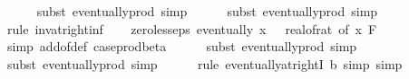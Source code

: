\begin{isabellebody}
\ \ \ \ \isamarkupfalse%
\ {\isacharparenleft}{\kern0pt}subst\ eventually{\isacharunderscore}{\kern0pt}prod{}{\isacharprime}{\kern0pt}{\isacharcomma}{\kern0pt}\ simp{\isacharparenright}{\kern0pt}\isanewline
\ \ \ \ \isamarkupfalse%
\ {\isacharparenleft}{\kern0pt}subst\ eventually{\isacharunderscore}{\kern0pt}prod{}{\isacharprime}{\kern0pt}{\isacharcomma}{\kern0pt}\ simp{\isacharparenright}{\kern0pt}\isanewline
\ \ \ \ \isamarkupfalse%
\ {\isacharparenleft}{\kern0pt}rule\ inv{\isacharunderscore}{\kern0pt}at{\isacharunderscore}{\kern0pt}right{\isacharunderscore}{\kern0pt}{}{\isacharunderscore}{\kern0pt}inf{\isacharparenright}{\kern0pt}\isanewline
\isanewline
\ \ \isamarkupfalse%
\ zero{\isacharunderscore}{\kern0pt}less{\isacharunderscore}{\kern0pt}eps{\isacharcolon}{\kern0pt}\ {\isachardoublequoteopen}eventually\ {\isacharparenleft}{\kern0pt}{\isasymlambda}x{\isachardot}{\kern0pt}\ {}\ {\isacharless}{\kern0pt}\ {\isacharparenleft}{\kern0pt}real{\isacharunderscore}{\kern0pt}of{\isacharunderscore}{\kern0pt}rat\ {\isacharparenleft}{\kern0pt}{\isasymepsilon}{\isacharunderscore}{\kern0pt}of\ x{\isacharparenright}{\kern0pt}{\isacharparenright}{\kern0pt}{\isacharparenright}{\kern0pt}\ {\isacharquery}{\kern0pt}F{\isachardoublequoteclose}\isanewline
\ \ \ \ \isamarkupfalse%
\ {\isacharparenleft}{\kern0pt}simp\ add{\isacharcolon}{\kern0pt}{\isasymepsilon}{\isacharunderscore}{\kern0pt}of{\isacharunderscore}{\kern0pt}def\ case{\isacharunderscore}{\kern0pt}prod{\isacharunderscore}{\kern0pt}beta{\isacharprime}{\kern0pt}{\isacharparenright}{\kern0pt}\isanewline
\ \ \ \ \isamarkupfalse%
\ {\isacharparenleft}{\kern0pt}subst\ eventually{\isacharunderscore}{\kern0pt}prod{}{\isacharprime}{\kern0pt}{\isacharcomma}{\kern0pt}\ simp{\isacharparenright}{\kern0pt}\isanewline
\ \ \ \ \isamarkupfalse%
\ {\isacharparenleft}{\kern0pt}subst\ eventually{\isacharunderscore}{\kern0pt}prod{}{\isacharprime}{\kern0pt}{\isacharcomma}{\kern0pt}\ simp{\isacharparenright}{\kern0pt}\isanewline
\ \ \ \ \isamarkupfalse%
\ {\isacharparenleft}{\kern0pt}rule\ eventually{\isacharunderscore}{\kern0pt}at{\isacharunderscore}{\kern0pt}rightI{\isacharbrackleft}{\kern0pt}\ b{\isacharequal}{\kern0pt}{\isachardoublequoteopen}{}{\isachardoublequoteclose}{\isacharbrackright}{\kern0pt}{\isacharcomma}{\kern0pt}\ simp{\isacharcomma}{\kern0pt}\ simp{\isacharparenright}{\kern0pt}\isanewline

\end{isabellebody}
